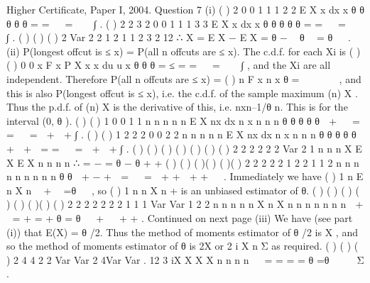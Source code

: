 Higher Certificate, Paper I, 2004. Question 7
(i) ( ) 2
0
0
1 1 1
2 2
E X x dx x
θ
θ θ
θ θ
= =   =   ∫ .
( ) 2
2 3 2
0
0
1 1 1
3 3
E X x dx x
θ
θ θ
θ θ
= =   =   ∫ .
( ) ( ) { ( )}
2
Var 2 2 1 2 1 1 2
3 2 12
∴ X = E X − E X = θ −  θ  = θ
 
.
(ii) P(longest offcut is ≤ x) = P(all n offcuts are ≤ x).
The c.d.f. for each Xi is ( ) ( ) 0
0
x
F x P X x x du u x
θ θ θ
= ≤ = =   =   ∫ , and the Xi are all
independent. Therefore P(all n offcuts are ≤ x) = { ( )}
n
F x n x
θ
=    
 
, and this is also
P(longest offcut is ≤ x), i.e. the c.d.f. of the sample maximum (n) X . Thus the p.d.f. of
(n) X is the derivative of this, i.e. nxn–1/θ n. This is for the interval (0, θ ).
( ) ( ) 1
0
0 1 1
n n
n n n
E X nx dx n x n
n n
θ
θ θ
θ θ
 + 
∴ = =   =  +  + ∫ .
( ) ( ) 1 2 2
2
0
0 2 2
n n
n n n
E X nx dx n x n
n n
θ
θ θ
θ θ
+  + 
= =   =  +  + ∫ .
( ) ( ) ( ) ( ) ( ) { ( )} ( )
2 2 2 2
2
2 Var
2 1 n n n
X E X E X n n
n n
∴ = − = θ − θ
+ +
( ) ( )
( )( ) ( )( )
2 2
2
2 2
1 2
2 1 1 2
n n n n n
n n n n
θ θ
 + − + 
=   =
 + +  + +  
.
Immediately we have ( )
1
n
E n X
n
 +  =θ
 
, so ( )
1
n
n X
n
+ is an unbiased estimator of θ.
( ) ( )
( ) ( ) ( )
( )( ) ( )
2 2 2 2
2 2 2
1 1 1 Var Var
1 2 2 n
n n n n X n X
n n n n n n n
 +  = + = + θ = θ   +   + +
.
Continued on next page
(iii) We have (see part (i)) that E(X) = θ /2. Thus the method of moments estimator
of θ /2 is X , and so the method of moments estimator of θ is 2X or 2
i X
n Σ as
required.
( ) ( ) ( )
2 4 4 2 2 Var Var 2 4Var Var .
12 3 iX X X X
n n n n
  = = = = θ =θ  
  Σ .
